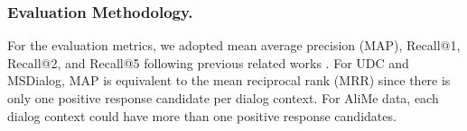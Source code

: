 
\subsubsection{\textbf{Evaluation Methodology}.}
For the evaluation metrics, we adopted mean average precision (MAP), Recall@1, Recall@2, and Recall@5 following previous related works \cite{DBLP:conf/acl/WuWXZL17,DBLP:journals/corr/LowePSP15}. For UDC and MSDialog,  MAP is equivalent to the mean reciprocal rank (MRR) since there is only one positive response candidate per dialog context. For AliMe data, each dialog context could have more than one positive response candidates.

